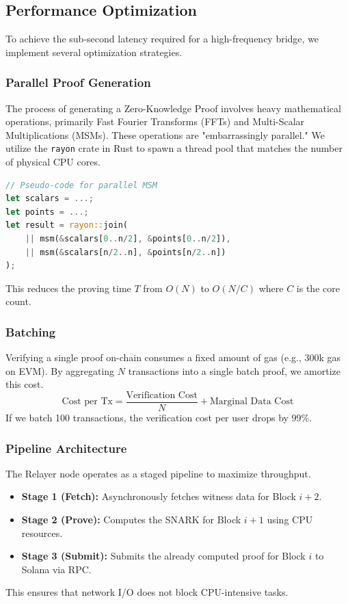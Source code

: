 \documentclass[11pt,a4paper]{article}
\begin{document}
\subsection{Performance Optimization}
To achieve the sub-second latency required for a high-frequency bridge, we implement several optimization strategies.

\subsubsection{Parallel Proof Generation}
The process of generating a Zero-Knowledge Proof involves heavy mathematical operations, primarily Fast Fourier Transforms (FFTs) and Multi-Scalar Multiplications (MSMs). These operations are "embarrassingly parallel." We utilize the \texttt{rayon} crate in Rust to spawn a thread pool that matches the number of physical CPU cores. 
\begin{lstlisting}[language=Rust, caption={Parallel MSM Example}]
// Pseudo-code for parallel MSM
let scalars = ...;
let points = ...;
let result = rayon::join(
    || msm(&scalars[0..n/2], &points[0..n/2]),
    || msm(&scalars[n/2..n], &points[n/2..n])
);
\end{lstlisting}
This reduces the proving time $T$ from $O(N)$ to $O(N/C)$ where $C$ is the core count.

\subsubsection{Batching}
Verifying a single proof on-chain consumes a fixed amount of gas (e.g., 300k gas on EVM). By aggregating $N$ transactions into a single batch proof, we amortize this cost.
$$ \text{Cost per Tx} = \frac{\text{Verification Cost}}{N} + \text{Marginal Data Cost} $$
If we batch 100 transactions, the verification cost per user drops by 99\%.

\subsubsection{Pipeline Architecture}
The Relayer node operates as a staged pipeline to maximize throughput.
\begin{itemize}
    \item \textbf{Stage 1 (Fetch):} Asynchronously fetches witness data for Block $i+2$.
    \item \textbf{Stage 2 (Prove):} Computes the SNARK for Block $i+1$ using CPU resources.
    \item \textbf{Stage 3 (Submit):} Submits the already computed proof for Block $i$ to Solana via RPC.
\end{itemize}
This ensures that network I/O does not block CPU-intensive tasks.
\end{document}
